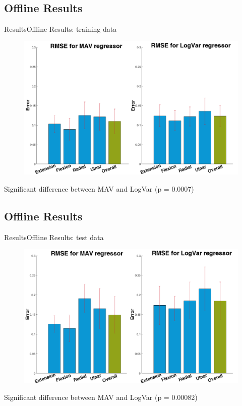 \documentclass[10pt]{beamer}
\begin{document}
\subsection{Offline Results}
	\begin{frame}{Results}{Offline Results: training data}
		\begin{figure}
			\includegraphics[scale=0.27]{figures/gimmeThemRMSEBars.png}
		\end{figure}
	Significant difference between MAV and LogVar (p = 0.0007)
\end{frame}

\subsection{Offline Results}
\begin{frame}{Results}{Offline Results: test data}
\begin{figure}
	\includegraphics[scale=0.27]{figures/RMSEBarPlotNewData.png}
\end{figure}
Significant difference between MAV and LogVar (p = 0.00082)
\end{frame}
\end{document}

